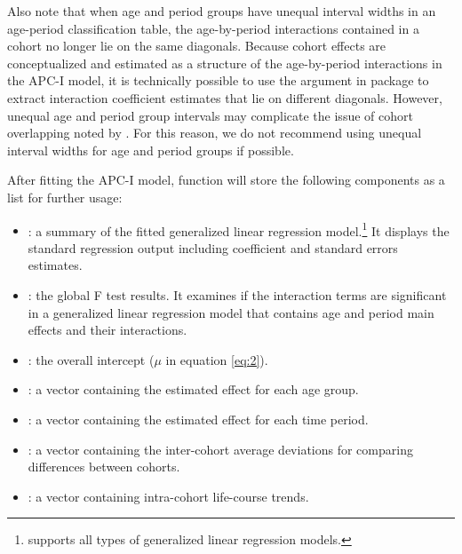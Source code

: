 Also note that when age and period groups have unequal interval widths in an age-period classification table, the age-by-period interactions contained in a cohort no longer lie on the same diagonals. Because cohort effects are conceptualized and estimated as a structure of the age-by-period interactions in the APC-I model, it is technically possible to use the argument {} in package  to extract interaction coefficient estimates that lie on different diagonals. However, unequal age and period group intervals may complicate the issue of cohort overlapping noted by \citet{kupper_statistical_1985}.  For this reason, we do not recommend using unequal interval widths for age and period groups if possible. 

After fitting the APC-I model, function {} will store the following components as a list for further usage:
\begin{itemize}
\item {}: a summary of the fitted generalized linear regression model.\footnote{ supports all types of generalized linear regression models.} It displays the standard regression output including coefficient and standard errors estimates.

\item {}: the global F test results. It examines if the interaction terms are significant in a generalized linear regression model that contains age and period main effects and their interactions.

\item {}: the overall intercept ($\mu$ in equation \ref{eq:2}).

\item {}: a vector containing the estimated effect for each age group.

\item {}: a vector containing the estimated effect for each time period.

\item {}: a vector containing the inter-cohort average deviations for comparing differences between cohorts.

\item {}: a vector containing intra-cohort life-course trends.

\end{itemize}


